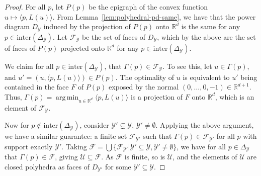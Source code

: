 \documentclass[11pt]{article}
\newcommand{\reals}{\mathbb{R}}
\newcommand{\simplex}{\Delta_\Y}
\newcommand{\F}{\mathcal{F}}
\newcommand{\U}{\mathcal{U}}
\newcommand{\Y}{\mathcal{Y}}
\newcommand{\inprod}[2]{\langle #1, #2 \rangle}%
\newcommand{\inter}{\mathrm{inter}}
\DeclareMathOperator*{\argmin}{arg\,min}
\begin{document}
\polyhedralrangegamma*
\begin{proof}
	For all $p$, let $P(p)$ be the epigraph of the convex function $u\mapsto \inprod{p}{L(u)}$.
	From Lemma~\ref{lem:polyhedral-pd-same}, we have that the power diagram $D_\Y$ induced by the projection of $P(p)$ onto $\reals^d$ is the same for any $p\in\inter(\simplex)$.
	Let $\F_\Y$ be the set of faces of $D_\Y$, which by the above are the set of faces of $P(p)$ projected onto $\reals^d$ for any $p\in\inter(\simplex)$.
	
	We claim for all $p\in\inter(\simplex)$, that $\Gamma(p) \in \F_\Y$.
	To see this, let $u \in \Gamma(p)$, and $u' = (u,\inprod{p}{L(u)}) \in P(p)$.
	The optimality of $u$ is equivalent to $u'$ being contained in the face $F$ of $P(p)$ exposed by the normal $(0,\ldots,0,-1)\in\reals^{d+1}$.
	Thus, $\Gamma(p) = \argmin_{u\in\reals^d} \inprod{p}{L(u)}$ is a projection of $F$ onto $\reals^d$, which is an element of $\F_\Y$.
	
	Now for $p \not \in \inter(\simplex)$, consider $\Y'\subsetneq \Y$, $\Y'\neq\emptyset$.
	Applying the above argument, we have a similar guarantee: a finite set $\F_{\Y'}$ such that $\Gamma(p) \in \F_{\Y'}$ for all $p$ with support exactly $\Y'$.
	Taking $\F = \bigcup\{\F_{\Y'} | \Y'\subseteq\Y, \Y'\neq\emptyset\}$, we have for all $p\in\simplex$ that $\Gamma(p) \in \F$, giving $\U \subseteq \F$.
	As $\F$ is finite, so is $\U$, and the elements of $\U$ are closed polyhedra as faces of $D_{\Y'}$ for some $\Y'\subseteq\Y$.
\end{proof}
\end{document}
